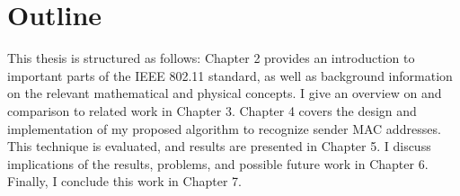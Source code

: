 
\section{Outline}

This thesis is structured as follows: Chapter 2 provides an introduction to important parts of the \gls{IEEE} 802.11 standard, as well as background information on the relevant mathematical and physical concepts. I give an overview on and comparison to related work in Chapter 3. Chapter 4 covers the design and implementation of my proposed algorithm to recognize sender \gls{MAC} addresses. This technique is evaluated, and results are presented in Chapter 5. I discuss implications of the results, problems, and possible future work in Chapter 6. Finally, I conclude this work in Chapter 7.
